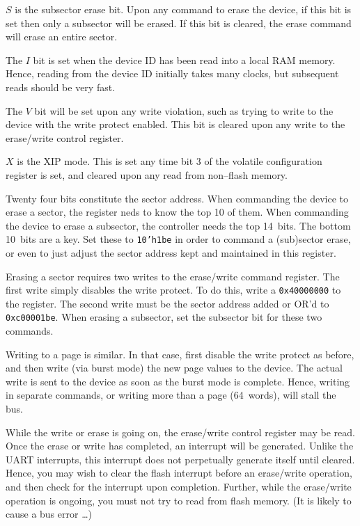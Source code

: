 \documentclass{gqtekspec}
\begin{document}
$S$ is the subsector erase bit.  Upon any command to erase the device, if this
bit is set then only a subsector will be erased.  If this bit is cleared,
the erase command will erase an entire sector.

The $I$ bit is set when the device ID has been read into a local RAM memory.
Hence, reading from the device ID initially takes many clocks, but subsequent
reads should be very fast.

The $V$ bit will be set upon any write violation, such as trying to write to
the device with the write protect enabled.  This bit is cleared upon any
write to the erase/write control register.

$X$ is the XIP mode.  This is set any time bit 3 of the volatile configuration
register is set, and cleared upon any read from non--flash memory.

Twenty four bits constitute the sector address.  When commanding the device
to erase a sector, the register neds to know the top 10 of them.  When
commanding the device to erase a subsector, the controller needs the top
14~bits.  The bottom 10~bits are a key.  Set these to {\tt 10'h1be} in order
to command a (sub)sector erase, or even to just adjust the sector address
kept and maintained in this register.

Erasing a sector requires two writes to the erase/write command register.
The first write simply disables the write protect.  To do this, write a
{\tt 0x40000000} to the register.  The second write must be the sector
address added or OR'd to {\tt 0xc00001be}.  When erasing a subsector,
set the subsector bit for these two commands.

Writing to a page is similar.  In that case, first disable the write protect
as before, and then write (via burst mode) the new page values to the device.
The actual write is sent to the device as soon as the burst mode is complete.
Hence, writing in separate commands, or writing more than a page (64~words),
will stall the bus.

While the write or erase is going on, the erase/write control register may be
read.  Once the erase or write has completed, an interrupt will be generated.
Unlike the UART interrupts, this interrupt does not perpetually generate itself
until cleared.  Hence, you may wish to clear the flash interrupt before
an erase/write operation, and then check for the interrupt upon completion.
Further, while the erase/write operation is ongoing, you must not try to read
from flash memory.  (It is likely to cause a bus error \ldots)
\end{document}
